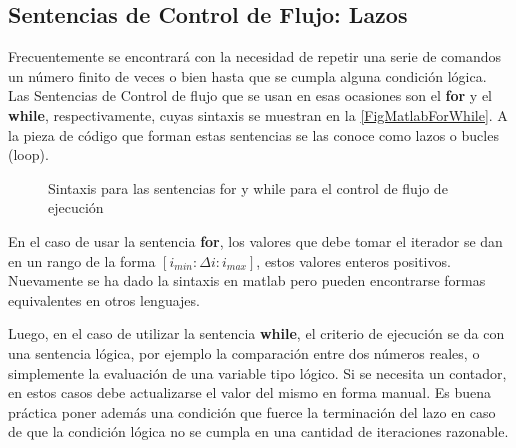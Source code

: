 \subsection{Sentencias de Control de Flujo: Lazos}


Frecuentemente se encontrará con la necesidad de repetir una serie de 
comandos un número finito de veces o bien hasta que se cumpla alguna 
condición lógica. Las Sentencias de Control de flujo que se usan en esas 
ocasiones son el \textbf{for} y el \textbf{while}, respectivamente, 
cuyas sintaxis se muestran en la \autoref{FigMatlabForWhile}. A la pieza de
código que forman estas sentencias se las conoce como
lazos o bucles (loop).

\begin{figure}
  \caption{
    Sintaxis para las sentencias for y while
  para el control de flujo de ejecución \label{FigMatlabForWhile}
}
\end{figure}

En el caso de usar la sentencia \textbf{for}, los valores que debe tomar
el iterador se dan en un rango de la forma  $[ i_{min} :  \Delta i : i_{max} ]$, 
estos valores enteros positivos. Nuevamente se ha dado la sintaxis en matlab
pero pueden encontrarse formas equivalentes en otros lenguajes. 

Luego, en el caso de utilizar la sentencia \textbf{while}, el criterio 
de ejecución se da con una sentencia lógica, por ejemplo la comparación
entre dos números reales, o simplemente la evaluación de una 
variable tipo lógico. Si se necesita un contador, en estos casos
debe actualizarse el valor del mismo en forma manual. Es buena
práctica poner además una condición que fuerce la terminación  
del lazo en caso de que la condición lógica no se cumpla 
en una cantidad de iteraciones razonable. 

\mode*

